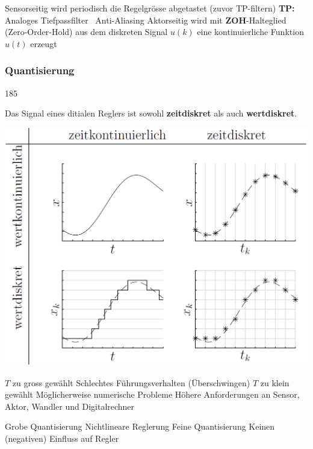 \begin{outline}
    \1 Sensorseitig wird periodisch die Regelgrösse abgetastet (zuvor TP-filtern)
        \2 \textbf{TP:} Analoges Tiefpassfilter \textrightarrow\ Anti-Aliasing
    \1 Aktorseitig wird mit \textbf{ZOH}-Halteglied (Zero-Order-Hold) aus dem diskreten Signal $u(k)$ eine kontinuierliche Funktion $u(t)$ erzeugt 
\end{outline}


\subsubsection{Quantisierung}{185}

 Das Signal eines ditialen Reglers ist sowohl \textbf{zeitdiskret} als auch \textbf{wertdiskret}.
 \vspace{0.2cm}

\begin{minipage}[c]{0.4\columnwidth}
    \includegraphics[width=\columnwidth]{images/abtastung.png}
\end{minipage}
\hfill
\begin{minipage}[c]{0.58\columnwidth}

    \textbf{}

    \begin{outline}
        \1 $T$ zu gross gewählt
            \2 Schlechtes Führungsverhalten (Überschwingen)
        \1 $T$ zu klein gewählt
            \2 Möglicherweise numerische Probleme
            \2 Höhere Anforderungen an Sensor, Aktor, Wandler und Digitalrechner
    \end{outline}


    \textbf{}

    \begin{outline}
        \1 Grobe Quantisierung
            \2 Nichtlineare Reglerung
        \1 Feine Quantisierung
            \2 Keinen (negativen) Einfluss auf Regler 
    \end{outline}
\end{minipage}


